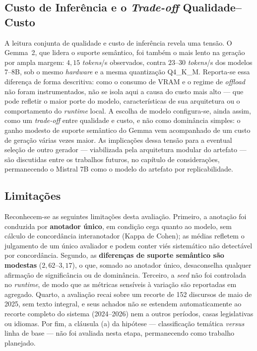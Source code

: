 \subsection{Custo de Inferência e o \textit{Trade-off} Qualidade--Custo}
A leitura conjunta de qualidade e custo de inferência revela uma tensão. O Gemma~2, que lidera o suporte semântico, foi também o mais lento na geração por ampla margem: $4{,}15$ \textit{tokens}/s observados, contra $23$--$30$ \textit{tokens}/s dos modelos 7--8B, sob o mesmo \textit{hardware} e a mesma quantização Q4\_K\_M. Reporta-se essa diferença de forma descritiva: como o consumo de VRAM e o regime de \textit{offload} não foram instrumentados, não se isola aqui a causa do custo mais alto --- que pode refletir o maior porte do modelo, características de sua arquitetura ou o comportamento do \textit{runtime} local. A escolha de modelo configura-se, ainda assim, como um \textit{trade-off} entre qualidade e custo, e não como dominância simples: o ganho modesto de suporte semântico do Gemma vem acompanhado de um custo de geração várias vezes maior. As implicações dessa tensão para a eventual seleção de outro gerador --- viabilizada pela arquitetura modular do artefato --- são discutidas entre os trabalhos futuros, no capítulo de considerações, permanecendo o Mistral 7B como o modelo do artefato por replicabilidade.

\subsection{Limitações}
Reconhecem-se as seguintes limitações desta avaliação. Primeiro, a anotação foi conduzida por \textbf{anotador único}, em condição cega quanto ao modelo, sem cálculo de concordância interanotador (Kappa de Cohen); as médias refletem o julgamento de um único avaliador e podem conter viés sistemático não detectável por concordância. Segundo, as \textbf{diferenças de suporte semântico são modestas} ($2{,}62$--$3{,}17$), o que, somado ao anotador único, desaconselha qualquer afirmação de significância ou de dominância. Terceiro, a \textit{seed} não foi controlada no \textit{runtime}, de modo que as métricas sensíveis à variação são reportadas em agregado. Quarto, a avaliação recai sobre um recorte de 152 discursos de maio de 2025, sem texto integral, e seus achados não se estendem automaticamente ao recorte completo do sistema (2024--2026) nem a outros períodos, casas legislativas ou idiomas. Por fim, a cláusula (a) da hipótese --- classificação temática \textit{versus} linha de base --- não foi avaliada nesta etapa, permanecendo como trabalho planejado.
